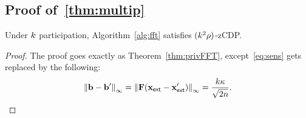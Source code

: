 \subsection{Proof of~\cref{thm:multip}}\label{app:ssec:multip}
\begin{namedtheorem}
Under $k$ participation, Algorithm~\ref{alg:fft} satisfies $(k^2\rho)$-zCDP.
\end{namedtheorem}
\begin{proof}
The proof goes exactly as Theorem~\ref{thm:privFFT}, except~\eqref{eq:sens} gets replaced by the following:
\begin{equation}
    \left\|\mathbf{b}-\mathbf{b}'\right\|_\infty=\left\|\mathbf{F}(\mathbf{x}_{\sf ext}-\mathbf{x}_{\sf ext}')\right\|_\infty=\frac{k\kappa}{\sqrt{2n}}.\label{eq:sensx}
\end{equation}
\end{proof}




